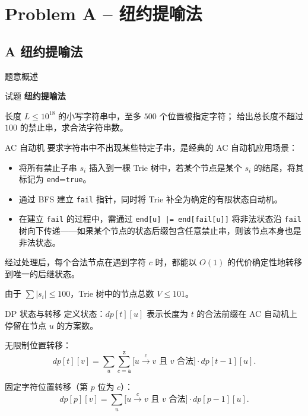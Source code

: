 \documentclass{beamer}
\newcommand{\TT}[1]{{\ttfamily #1}}
\newcommand{\BF}[1]{\textbf{#1}}
\begin{document}

{
\section[A]{Problem A -- 纽约提喻法}
\subsection{A 纽约提喻法}
\begin{frame}{题意概述}
  \begin{center}
  试题 \myboxi{\BF{\TT{A}}} \BF{纽约提喻法}
  \end{center}
  长度 $L\le 10^{18}$ 的小写字符串中，至多 $500$ 个位置被指定字符；
  给出总长度不超过 $100$ 的禁止串，求合法字符串数。
\end{frame}

\begin{frame}{AC 自动机}
  要求字符串中不出现某些特定子串，是经典的 AC 自动机应用场景：

  \begin{itemize}
    \item 将所有禁止子串 $s_i$ 插入到一棵 Trie 树中，若某个节点是某个 $s_i$ 的结尾，将其标记为 \texttt{end}=\texttt{true}。
    \item 通过 BFS 建立 \texttt{fail} 指针，同时将 Trie 补全为确定的有限状态自动机。
    \item 在建立 \texttt{fail} 的过程中，需通过 \texttt{end[u] |= end[fail[u]]} 将非法状态沿 \texttt{fail} 树向下传递——如果某个节点的状态后缀包含任意禁止串，则该节点本身也是非法状态。
  \end{itemize}

  经过处理后，每个合法节点在遇到字符 $c$ 时，都能以 $O(1)$ 的代价确定性地转移到唯一的后继状态。

  \vspace{0.5em}
  由于 $\sum|s_i|\le 100$，Trie 树中的节点总数 $V\le 101$。
\end{frame}

\begin{frame}{DP 状态与转移}
  定义状态：$dp[t][u]$ 表示长度为 $t$ 的合法前缀在 AC 自动机上停留在节点 $u$ 的方案数。

  \vspace{0.5em}
  无限制位置转移：
  \[
    dp[t][v]=\sum_{u}\sum_{c=\texttt{a}}^{\texttt{z}}
    \bigl[u\xrightarrow{c}v\text{ 且 }v\text{ 合法}\bigr]\cdot dp[t-1][u].
  \]

  \vspace{0.5em}
  固定字符位置转移（第 $p$ 位为 $c$）：
  \[
    dp[p][v]=\sum_{u}\bigl[u\xrightarrow{c}v\text{ 且 }v\text{ 合法}\bigr]\cdot dp[p-1][u].
  \]
\end{frame}

}
\end{document}

